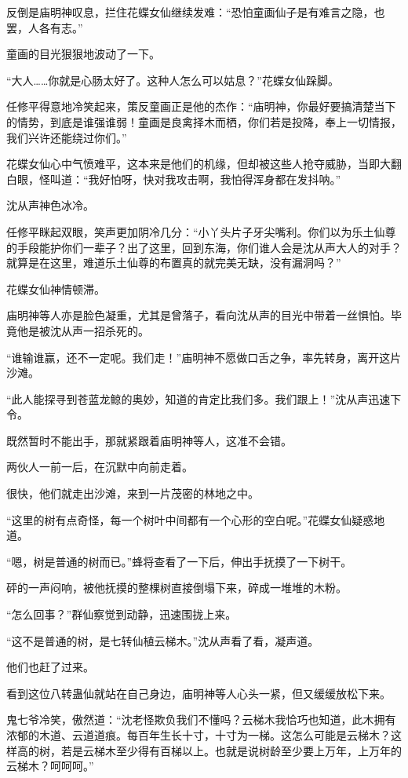 \begin{this_body}
反倒是庙明神叹息，拦住花蝶女仙继续发难：“恐怕童画仙子是有难言之隐，也罢，人各有志。”

童画的目光狠狠地波动了一下。

“大人……你就是心肠太好了。这种人怎么可以姑息？”花蝶女仙跺脚。

任修平得意地冷笑起来，策反童画正是他的杰作：“庙明神，你最好要搞清楚当下的情势，到底是谁强谁弱！童画是良禽择木而栖，你们若是投降，奉上一切情报，我们兴许还能绕过你们。”

花蝶女仙心中气愤难平，这本来是他们的机缘，但却被这些人抢夺威胁，当即大翻白眼，怪叫道：“我好怕呀，快对我攻击啊，我怕得浑身都在发抖呐。”

沈从声神色冰冷。

任修平眯起双眼，笑声更加阴冷几分：“小丫头片子牙尖嘴利。你们以为乐土仙尊的手段能护你们一辈子？出了这里，回到东海，你们谁人会是沈从声大人的对手？就算是在这里，难道乐土仙尊的布置真的就完美无缺，没有漏洞吗？”

花蝶女仙神情顿滞。

庙明神等人亦是脸色凝重，尤其是曾落子，看向沈从声的目光中带着一丝惧怕。毕竟他是被沈从声一招杀死的。

“谁输谁赢，还不一定呢。我们走！”庙明神不愿做口舌之争，率先转身，离开这片沙滩。

“此人能探寻到苍蓝龙鲸的奥妙，知道的肯定比我们多。我们跟上！”沈从声迅速下令。

既然暂时不能出手，那就紧跟着庙明神等人，这准不会错。

两伙人一前一后，在沉默中向前走着。

很快，他们就走出沙滩，来到一片茂密的林地之中。

“这里的树有点奇怪，每一个树叶中间都有一个心形的空白呢。”花蝶女仙疑惑地道。

“嗯，树是普通的树而已。”蜂将查看了一下后，伸出手抚摸了一下树干。

砰的一声闷响，被他抚摸的整棵树直接倒塌下来，碎成一堆堆的木粉。

“怎么回事？”群仙察觉到动静，迅速围拢上来。

“这不是普通的树，是七转仙植云梯木。”沈从声看了看，凝声道。

他们也赶了过来。

看到这位八转蛊仙就站在自己身边，庙明神等人心头一紧，但又缓缓放松下来。

鬼七爷冷笑，傲然道：“沈老怪欺负我们不懂吗？云梯木我恰巧也知道，此木拥有浓郁的木道、云道道痕。每百年生长十寸，十寸为一梯。这怎么可能是云梯木？这样高的树，若是云梯木至少得有百梯以上。也就是说树龄至少要上万年，上万年的云梯木？呵呵呵。”


\end{this_body}

